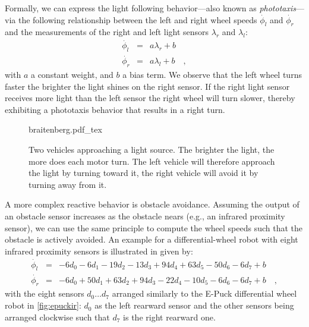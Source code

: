 Formally, we can express the light following behavior---also known as \textsl{phototaxis}---via the following relationship between
the left and right wheel speeds $\dot{\phi_l}$ and $\dot{\phi_r}$ and the measurements of the right and left light sensors $\lambda_r$ and $\lambda_l$:
\begin{eqnarray}\label{eq:simplereactive}
\dot{\phi_l}&=&a \lambda_r + b\quad \\
\dot{\phi_r}&=&a \lambda_l + b\quad,
\end{eqnarray}
with $a$ a constant weight, and $b$ a bias term. We observe that the left wheel turns faster the brighter the light shines on the right sensor. If the right light sensor receives more light than the left sensor the right wheel will turn slower, thereby exhibiting a phototaxis behavior that results in a right turn.

\begin{figure}
    \centering
    \def\svgwidth{0.7\textwidth}
    {braitenberg.pdf_tex}
    \caption{Two vehicles approaching a light source. The brighter the light, the more does each motor turn. The left vehicle will therefore approach the light by turning toward it, the right vehicle will avoid it by turning away from it.\label{fig:braitenberg}}
\end{figure}

A more complex reactive behavior is obstacle avoidance. Assuming the output of an obstacle sensor increases as the obstacle nears (e.g., an infrared proximity sensor), we can use the same principle to compute the wheel speeds such that the obstacle is actively avoided. An example for a differential-wheel robot with eight infrared proximity sensors is illustrated in  given by:
\begin{eqnarray}
\nonumber
\dot{\phi_l}&=&-6d_0-6d_1-19d_2-13d_3+94d_4+63d_5-50d_6-6d_7+b\\
\nonumber
\dot{\phi_r}&=&-6d_0+50d_1+63d_2+94d_3-22d_4-10d_5-6d_6-6d_7+b \quad,
\end{eqnarray}
%
%
with the eight sensors $d_0 \ldots d_7$ arranged similarly to the E-Puck differential wheel robot in \cref{fig:epuckir}: $d_0$ as the left rearward sensor and the other sensors being arranged clockwise such that $d_7$ is the right rearward one.

